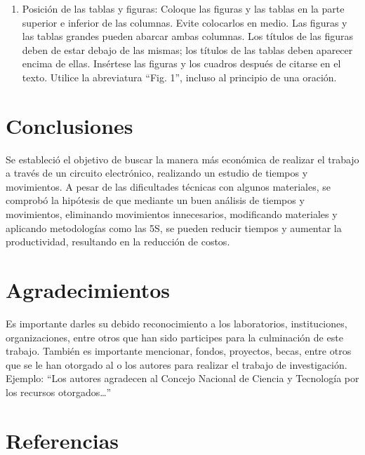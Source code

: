     \begin{enumerate}
        \item Posición de las tablas y figuras: Coloque las figuras y las tablas en la parte superior e inferior de las columnas. Evite colocarlos en medio. Las figuras y las tablas grandes pueden abarcar ambas columnas. Los títulos de las figuras deben de estar debajo de las mismas; los títulos de las tablas deben aparecer encima de ellas. Insértese las figuras y los cuadros después de citarse en el texto. Utilice la abreviatura “Fig. 1”, incluso al principio de una oración. 
    \end{enumerate}
    
    \section{Conclusiones}
    
        Se estableció el objetivo de buscar la manera más económica de realizar el trabajo a través de un circuito electrónico, realizando un estudio de tiempos y movimientos. A pesar de las dificultades técnicas con algunos materiales, se comprobó la hipótesis de que mediante un buen análisis de tiempos y movimientos, eliminando movimientos innecesarios, modificando materiales y aplicando metodologías como las 5S, se pueden reducir tiempos y aumentar la productividad, resultando en la reducción de costos.
    
    
    
    \section{Agradecimientos}
    
    Es importante darles su debido reconocimiento a los laboratorios, instituciones, organizaciones, entre otros que han sido participes para la culminación de este trabajo. También es importante mencionar, fondos, proyectos, becas, entre otros que se le han otorgado al o los autores para realizar el trabajo de investigación. Ejemplo: “Los autores agradecen al Concejo Nacional de Ciencia y Tecnología por los recursos otorgados…”
    
    \section*{Referencias}
    
